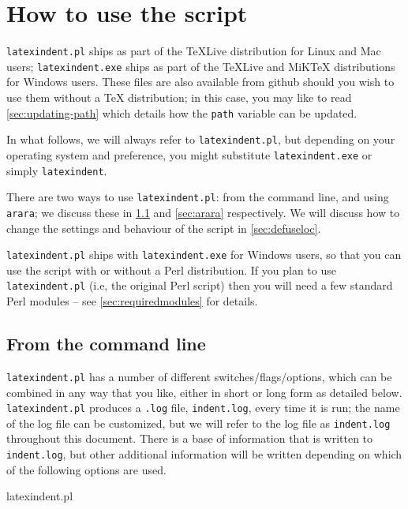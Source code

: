 \section{How to use the script}
 \texttt{latexindent.pl} ships as part of the \TeX Live distribution for Linux and Mac users; \texttt{latexindent.exe} ships as part of the \TeX Live and MiK\TeX{} distributions for Windows users.
 These files are also available from github \cite{latexindent-home} should you wish to use them without a \TeX{} distribution; in this case, you may like to read \vref{sec:updating-path} which details how the \texttt{path} variable can be updated.

 In what follows, we will always refer to \texttt{latexindent.pl}, but depending on your operating system and preference, you might substitute \texttt{latexindent.exe} or simply \texttt{latexindent}.

 There are two ways to use \texttt{latexindent.pl}: from the command line, and using \texttt{arara}; we discuss these in \cref{sec:commandline} and \cref{sec:arara} respectively.
 We will discuss how to change the settings and behaviour of the script in \vref{sec:defuseloc}.

 \texttt{latexindent.pl} ships with \texttt{latexindent.exe} for Windows users, so that you can use the script with or without a Perl distribution.
 If you plan to use \texttt{latexindent.pl} (i.e, the original Perl script) then you will need a few standard Perl modules -- see \vref{sec:requiredmodules} for details.

\subsection{From the command line}
	\label{sec:commandline}
	\texttt{latexindent.pl} has a number of different switches/flags/options, which can be combined in any way that you like, either in short or long form as detailed below.
	\texttt{latexindent.pl}  produces a \texttt{.log} file, \texttt{indent.log}, every time it is run; the name of the log file can be customized, but we will refer to the log file as \texttt{indent.log} throughout this document.
	There is a base of information that is written to \texttt{indent.log}, but other additional information will be written depending on which of the following options are used.

	\begin{commandshell}
latexindent.pl
      \end{commandshell}

